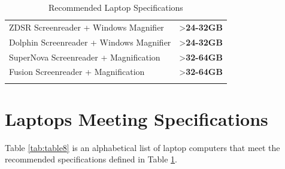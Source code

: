 \begin{longtable}[]{@{}
	>{\raggedright\arraybackslash}m{}
	>{\raggedright\arraybackslash}b{}@{}
	}
	ZDSR Screenreader + Windows Magnifier                                                                                                                                                                                                                                            & \textgreater\textbf{24-32GB} \\[1.0em]
	Dolphin Screenreader + Windows Magnifier                                                                                                                                                                                                                                         & \textgreater\textbf{24-32GB} \\[1.0em]
	SuperNova Screenreader + Magnification                                                                                                                                                                                                                                           & \textgreater\textbf{32-64GB} \\[1.0em]
	Fusion Screenreader + Magnification                                                                                                                                                                                                                                              & \textgreater\textbf{32-64GB} \\[1.0em] \hline
	\caption{Recommended Laptop Specifications}\label{tab:table7}
\end{longtable}

\pagebreak
\hypertarget{laptops-meeting-recommended-specifications}{}\section{Laptops Meeting Specifications}\label{laptops-meeting-recommended-specifications}
Table \ref{tab:table8} is an alphabetical list of laptop computers that meet the recommended specifications defined in Table \ref{tab:table7}.

